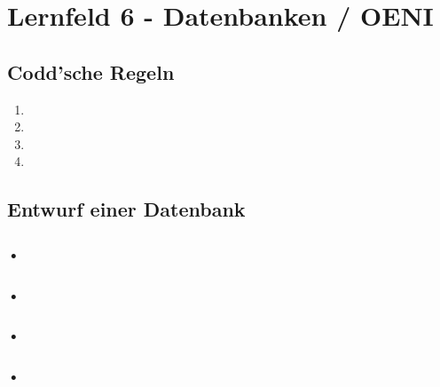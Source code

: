 \section{Lernfeld 6 - Datenbanken / OENI} %

\subsection{Codd'sche Regeln}
\begin{enumerate}
	\item 
	\item 
	\item 
	\item 
\end{enumerate}


\subsection{Entwurf einer Datenbank}

\subsubsection{•}

\subsubsection{•}

\subsubsection{•}

\subsubsection{•}

